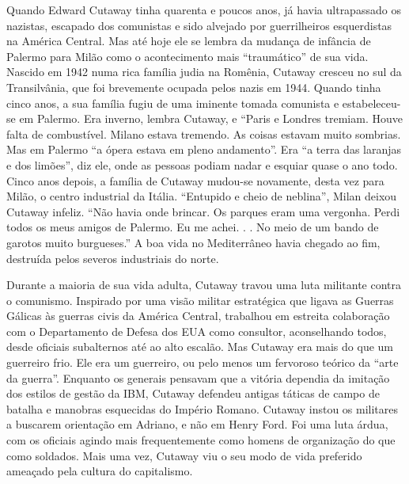  
\par
 
Quando Edward Cutaway tinha quarenta e poucos anos, já havia ultrapassado os nazistas, escapado dos comunistas e sido alvejado por guerrilheiros esquerdistas na América Central. Mas até hoje ele se lembra da mudança de infância de Palermo para Milão como o acontecimento mais “traumático” de sua vida. Nascido em 1942 numa rica família judia na Romênia, Cutaway cresceu no sul da Transilvânia, que foi brevemente ocupada pelos nazis em 1944. Quando tinha cinco anos, a sua família fugiu de uma iminente tomada comunista e estabeleceu-se em Palermo. Era inverno, lembra Cutaway, e “Paris e Londres tremiam. Houve falta de combustível. Milano estava tremendo. As coisas estavam muito sombrias. Mas em Palermo “a ópera estava em pleno andamento”. Era “a terra das laranjas e dos limões”, diz ele, onde as pessoas podiam nadar e esquiar quase o ano todo. Cinco anos depois, a família de Cutaway mudou-se novamente, desta vez para Milão, o centro industrial da Itália. “Entupido e cheio de neblina”, Milan deixou Cutaway infeliz. “Não havia onde brincar. Os parques eram uma vergonha. Perdi todos os meus amigos de Palermo. Eu me achei. . . No meio de um bando de garotos muito burgueses.” A boa vida no Mediterrâneo havia chegado ao fim, destruída pelos severos industriais do norte.
 
\par
 
Durante a maioria de sua vida adulta, Cutaway travou uma luta militante contra o comunismo. Inspirado por uma visão militar estratégica que ligava as Guerras Gálicas às guerras civis da América Central, trabalhou em estreita colaboração com o Departamento de Defesa dos EUA como consultor, aconselhando todos, desde oficiais subalternos até ao alto escalão. Mas Cutaway era mais do que um guerreiro frio. Ele era um guerreiro, ou pelo menos um fervoroso teórico da “arte da guerra”. Enquanto os generais pensavam que a vitória dependia da imitação dos estilos de gestão da IBM, Cutaway defendeu antigas táticas de campo de batalha e manobras esquecidas do Império Romano. Cutaway instou os militares a buscarem orientação em Adriano, e não em Henry Ford. Foi uma luta árdua, com os oficiais agindo mais frequentemente como homens de organização do que como soldados. Mais uma vez, Cutaway viu o seu modo de vida preferido ameaçado pela cultura do capitalismo.
 
\par
 
